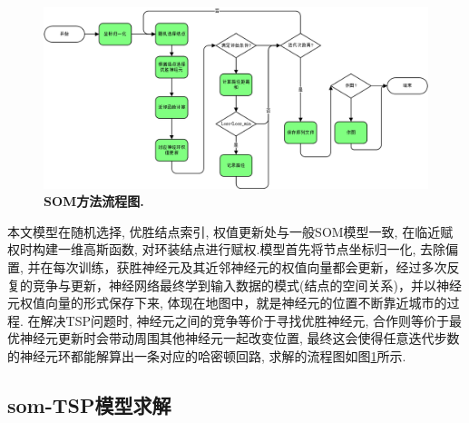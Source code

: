 \begin{figure}[h]
    \begin{center}
        \includegraphics[width=0.95\linewidth]{fig/som-pipline}
    \end{center}
    \caption{\textbf{SOM方法流程图.} }
        \label{fig:som-pipline}
  \end{figure}


本文模型在随机选择, 优胜结点索引, 权值更新处与一般SOM模型一致, 在临近赋权时构建一维高斯函数, 对环装结点进行赋权.模型首先将节点坐标归一化, 去除偏置, 并在每次训练，获胜神经元及其近邻神经元的权值向量都会更新，经过多次反复的竞争与更新，神经网络最终学到输入数据的模式(结点的空间关系)，并以神经元权值向量的形式保存下来, 体现在地图中，就是神经元的位置不断靠近城市的过程. 在解决TSP问题时, 神经元之间的竞争等价于寻找优胜神经元, 合作则等价于最优神经元更新时会带动周围其他神经元一起改变位置, 最终这会使得任意迭代步数的神经元环都能解算出一条对应的哈密顿回路, 求解的流程图如图\ref{fig:som-pipline}所示.






    
\subsection{som-TSP模型求解}

